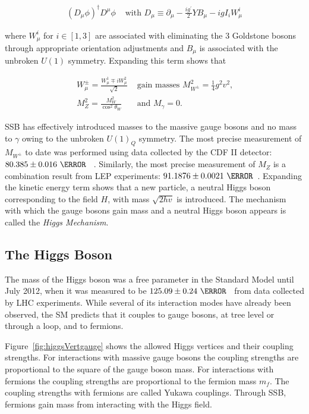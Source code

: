 \begin{equation}
\begin{aligned}
(D_\mu\phi)^\dagger D^\mu\phi & \text{ with } D_\mu \equiv \partial_\mu - \frac{ig^{'}}{2}YB_\mu - igI_iW^i_\mu 
\end{aligned}
\end{equation} 

where $W_\mu^i$ for $i\in[1,3]$ are associated with eliminating the 3 Goldstone bosons through 
appropriate orientation adjustments and $B_\mu$ is associated with the unbroken $U(1)$ symmetry. 
Expanding this term shows that 

\begin{equation}
\begin{aligned}
W_\mu^{\pm} = \frac{W_\mu^1 \mp iW_\mu^2}{\sqrt{2}} & \text{ gain masses } M^2_{W^\pm} = \frac{1}{4}g^2v^2 \text{,} \\
M_Z^2 = \frac{M_W^2}{\cos^2\theta_W} & \text{ and } M_{\gamma} = 0. 
\end{aligned}
\end{equation}

SSB has effectively introduced masses to the massive gauge bosons and no mass to $\gamma$ 
owing to the unbroken $U(1)_Q$ symmetry. The most precise measurement of $M_{W^\pm}$ to date 
was performed using data collected by the CDF II detector: $80.385\pm 0.016~\GeV$ ~\cite{Aaltonen:2012bp}.
Similarly, the most precise measurement of $M_Z$ is a combination result from LEP 
experiments: $91.1876\pm 0.0021~\GeV$~\cite{ALEPH:2005ab}.  
Expanding the kinetic energy term shows that a new particle, 
a neutral Higgs boson corresponding to the field $H$, with mass $\sqrt{2hv}$ is introduced. 
The mechanism with which the gauge bosons gain mass and a neutral Higgs boson appears is 
called the {\it Higgs Mechanism}.

\subsection{The Higgs Boson}
\label{sec:higgsSM}
\par The mass of the Higgs boson was a free parameter in the Standard Model until July 
2012, when it was measured to be $125.09\pm0.24~\GeV$~\cite{Aad2012tfa} from data collected by LHC 
experiments. While several of its interaction modes have already been observed, 
the SM predicts that it couples to gauge bosons, at tree level or through a loop, 
and to fermions.  

\par Figure~\ref{fig:higgsVertgauge} shows the allowed Higgs vertices and their coupling strengths. 
For interactions with massive gauge bosons the coupling strengths are proportional to the square of the gauge boson mass. 
For interactions with fermions the coupling strengths are proportional to the fermion mass $m_f$. The
coupling strengths with fermions are called Yukawa couplings. Through SSB, fermions gain mass from interacting 
with the Higgs field.   

